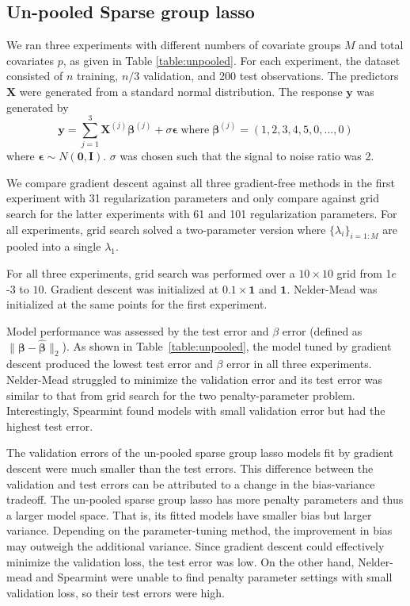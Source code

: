 \documentclass[12pt]{article}
\begin{document}
\subsection{Un-pooled Sparse group lasso}\label{sec:simulation_sgl}
We ran three experiments with different numbers of covariate groups $M$ and total covariates $p$, as given in Table \ref{table:unpooled}. For each experiment, the dataset consisted of $n$ training, $n/3$ validation, and 200 test observations. The predictors $\boldsymbol X$ were generated from a standard normal distribution. The response $\boldsymbol y$ was generated by
\begin{equation}
\boldsymbol y = \sum\limits_{j=1}^3 \boldsymbol X^{(j)} \boldsymbol \beta^{(j)} + \sigma \boldsymbol \epsilon \; \text{where} \; \boldsymbol \beta^{(j)} = (1, 2, 3, 4, 5, 0, ..., 0)
\end{equation}
where $\boldsymbol \epsilon \sim N(\boldsymbol 0, \boldsymbol I)$. $\sigma$ was chosen such that the signal to noise ratio was 2. 

We compare gradient descent against all three gradient-free methods in the first experiment with 31 regularization parameters and only compare against grid search for the latter experiments with 61 and 101 regularization parameters. For all experiments, grid search solved a two-parameter version where $\{\lambda_i\}_{i=1:M}$ are pooled into a single $\lambda_1$.

For all three experiments, grid search was performed over a $10 \times 10$ grid from 1$e$-3 to $10$. Gradient descent was initialized at $0.1 \times \boldsymbol 1$ and $\boldsymbol 1$. Nelder-Mead was initialized at the same points for the first experiment.

Model performance was assessed by the test error and $\beta$ error (defined as $\| \boldsymbol \beta - \hat {\boldsymbol \beta} \|_2$). As shown in Table~\ref{table:unpooled}, the model tuned by gradient descent produced the lowest test error and $\beta$ error in all three experiments. Nelder-Mead struggled to minimize the validation error and its test error was similar to that from grid search for the two penalty-parameter problem. Interestingly, Spearmint found models with small validation error but had the highest test error.

The validation errors of the un-pooled sparse group lasso models fit by gradient descent were much smaller than the test errors. This difference between the validation and test errors can be attributed to a change in the bias-variance tradeoff. The un-pooled sparse group lasso has more penalty parameters and thus a larger model space. That is, its fitted models have smaller bias but larger variance. Depending on the parameter-tuning method, the improvement in bias may outweigh the additional variance. Since gradient descent could effectively minimize the validation loss, the test error was low. On the other hand, Nelder-mead and Spearmint were unable to find penalty parameter settings with small validation loss, so their test errors were high.
\end{document}

